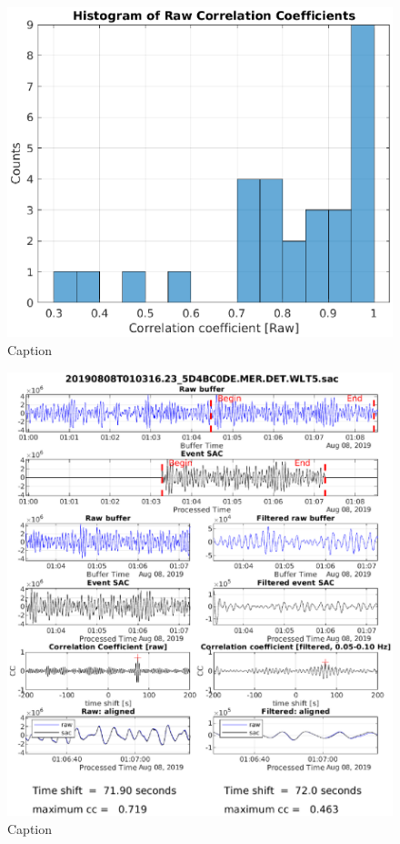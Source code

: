 \documentclass[11pt,letterpaper]{article}
\begin{document}
\begin{figure}
    \centering
    \includegraphics[width=0.5\linewidth]{Figures/Plots/filtered_cc_histogram.eps}
    \caption{Caption}
    \label{fig:filtered_cc_histogram}
\end{figure}

\begin{figure}
    \centering
    \includegraphics[width=\linewidth]{Figures/Matched_SACs/20190808T010316.eps}
    \caption{Caption}
    \label{fig:my_label}
\end{figure}
\end{document}

